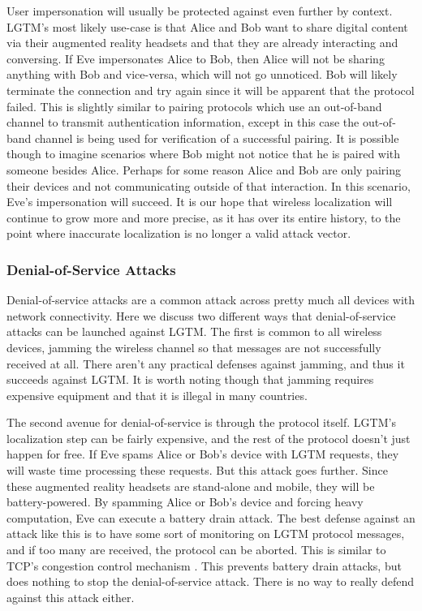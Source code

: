 \documentclass[12pt]{report}
\begin{document}
User impersonation will usually be protected against even further by context. LGTM's most likely use-case is that Alice and Bob want to share digital content via their augmented reality headsets and that they are already interacting and conversing. If Eve impersonates Alice to Bob, then Alice will not be sharing anything with Bob and vice-versa, which will not go unnoticed. Bob will likely terminate the connection and try again since it will be apparent that the protocol failed. This is slightly similar to pairing protocols which use an out-of-band channel to transmit authentication information, except in this case the out-of-band channel is being used for verification of a successful pairing. It is possible though to imagine scenarios where Bob might not notice that he is paired with someone besides Alice. Perhaps for some reason Alice and Bob are only pairing their devices and not communicating outside of that interaction. In this scenario, Eve's impersonation will succeed. It is our hope that wireless localization will continue to grow more and more precise, as it has over its entire history, to the point where inaccurate localization is no longer a valid attack vector. \par

\subsubsection{Denial-of-Service Attacks}
Denial-of-service attacks are a common attack across pretty much all devices with network connectivity. Here we discuss two different ways that denial-of-service attacks can be launched against LGTM. The first is common to all wireless devices, jamming the wireless channel so that messages are not successfully received at all. There aren't any practical defenses against jamming, and thus it succeeds against LGTM. It is worth noting though that jamming requires expensive equipment and that it is illegal in many countries. \par

The second avenue for denial-of-service is through the protocol itself. LGTM's localization step can be fairly expensive, and the rest of the protocol doesn't just happen for free. If Eve spams Alice or Bob's device with LGTM requests, they will waste time processing these requests. But this attack goes further. Since these augmented reality headsets are stand-alone and mobile, they will be battery-powered. By spamming Alice or Bob's device and forcing heavy computation, Eve can execute a battery drain attack. The best defense against an attack like this is to have some sort of monitoring on LGTM protocol messages, and if too many are received, the protocol can be aborted. This is similar to TCP's congestion control mechanism \cite{TcpCongestionControl2009}. This prevents battery drain attacks, but does nothing to stop the denial-of-service attack. There is no way to really defend against this attack either. \par
\end{document}
